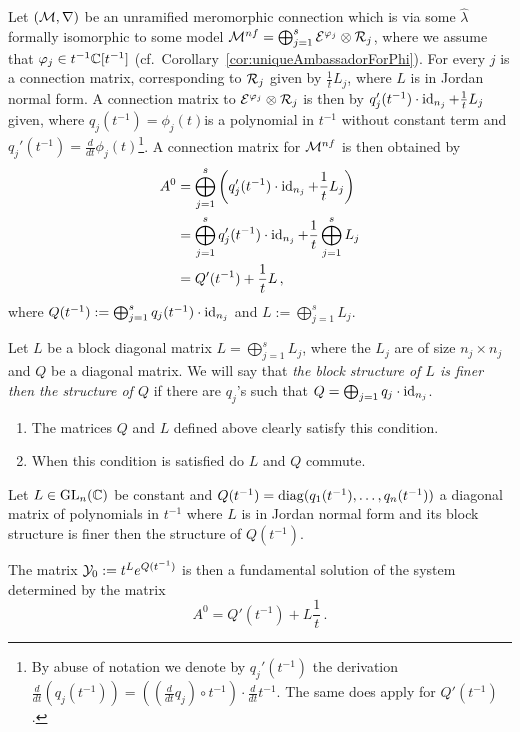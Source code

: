 Let $(\mathcal{M},\nabla)$ be an unramified meromorphic connection which is via some
$\hat\lambda$ formally isomorphic to some model
$\mathcal{M}^{nf}=\bigoplus_{j=1}^s\mathcal{E}^{\varphi_j}\otimes\mathcal{R}_j$, where we assume that
$\varphi_j\in t^{-1}\mathbb{C}[t^{-1}]$ (cf.~Corollary~\ref{cor:uniqueAmbassadorForPhi}).
For every $j$ is a connection matrix, corresponding to $\mathcal{R}_j$ given by
$\frac{1}{t}L_j$, where $L$ is in Jordan normal form.
A connection matrix to $\mathcal{E}^{\varphi_j}\otimes\mathcal{R}_j$ is then by
$q_j'(t^{-1})\cdot\operatorname{id}_{n_j}+\frac{1}{t}L_j$ given\TODO[(cf.~???)], where
$q_j(t^{-1})=\phi_j(t)$ is a polynomial in
$t^{-1}$ without constant term and
$q_j'(t^{-1})=\frac{d}{dt}\phi_j(t)$\footnote{By abuse of notation we denote by
  $q_j'(t^{-1})$ the derivation $\frac{d}{dt}(q_j(t^{-1}))=
  \left(\left(\frac{d}{dt}q_j\right)\circ t^{-1}\right) \cdot\frac{d}{dt}t^{-1}$.
  The same does apply for $Q'(t^{-1})$.}.
A connection matrix for $\mathcal{M}^{nf}$ is then obtained by
\begin{align*}
  A^0&= \bigoplus_{j=1}^s
       \left(q_j'(t^{-1})\cdot\operatorname{id}_{n_j}+\frac{1}{t}L_j\right)
  \\ &=\bigoplus_{j=1}^sq_j'(t^{-1})\cdot\operatorname{id}_{n_j}
       +\frac{1}{t}\bigoplus_{j=1}^sL_j
  \\ &=Q'(t^{-1})+\frac{1}{t}L \,,
\end{align*}
where
$Q(t^{-1}):=\bigoplus_{j=1}^sq_j(t^{-1})\cdot\operatorname{id}_{n_j}$
and $L:=\bigoplus_{j=1}^sL_j$.
\begin{defn}\label{defn:structureComparison}
  Let $L$ be a block diagonal matrix $L=\bigoplus_{j=1}^sL_j$, where the $L_j$
  are of size $n_j\times n_j$ and $Q$ be a diagonal matrix.
  We will say that \emph{the block structure of $L$ is finer then the
  structure of $Q$} if there are $q_j$'s such that
  $Q=\bigoplus_{j=1}q_j\cdot\operatorname{id}_{n_j}$.
  \begin{s-rem}
    \begin{enumerate}\label{rem:structureComparison}
      \item The matrices $Q$ and $L$ defined above clearly satisfy this
        condition.
      \item When this condition is satisfied do $L$ and $Q$ commute.
    \end{enumerate}
  \end{s-rem}
\end{defn}
\begin{prop}\label{prop:fundSolBuilder}
  Let $L\in \operatorname{GL}_n(\mathbb{C})$ be constant and
  $Q(t^{-1})=\operatorname{diag}(q_1(t^{-1}),\dots,q_n(t^{-1}))$ a diagonal matrix of
  polynomials in $t^{-1}$ where $L$ is in Jordan normal form and its block
  structure is finer then the structure of $Q(t^{-1})$.

  The matrix $\mathcal{Y}_0:=t^L e^{Q(t^{-1})}$ is then a fundamental solution of the
  system determined by the matrix
  \[
    A^0=Q'(t^{-1})+L\frac{1}{t} \,.
  \]
\end{prop}
